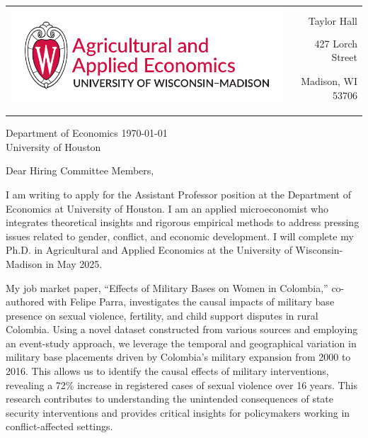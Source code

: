 \documentclass[12pt]{letter}
\begin{document}
\begin{tabularx}{\textwidth}{Xr}
\multirow{4}{*}{\includegraphics[height=3\baselineskip]{logo_cropped.pdf}} &  \\
& Taylor Hall \\
& 427 Lorch Street \\
& Madison, WI 53706 \\
[-1.8ex]\\
\\
\end{tabularx}

Department of Economics \hfill \today \\
University of Houston

\medskip

Dear Hiring Committee Members,

I am writing to apply for the Assistant Professor position at the Department of Economics at University of Houston. 
I am an applied microeconomist who integrates theoretical insights and rigorous empirical methods to address pressing issues related to gender, conflict, and economic development.
I will complete my Ph.D. in Agricultural and Applied Economics at the University of Wisconsin-Madison in May 2025. 

My job market paper, “Effects of Military Bases on Women in Colombia,” co-authored with Felipe Parra, investigates the causal impacts of military base presence 
on sexual violence, fertility, and child support disputes in rural Colombia. Using a novel dataset constructed from various sources and employing an event-study approach, 
we leverage the temporal and geographical variation in military base placements driven by Colombia's military expansion from 2000 to 2016. This allows us to identify 
the causal effects of military interventions, revealing a 72\% increase in registered cases of sexual violence over 16 years. 
This research contributes to understanding the unintended consequences of state security interventions and provides critical insights 
for policymakers working in conflict-affected settings.
\end{document}
